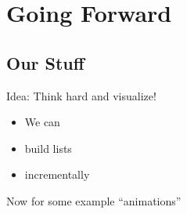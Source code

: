 \documentclass[aspectratio=169,hyperref={pdfusetitle,pdfencoding=auto}]{beamer}
\begin{document}
\section{Going Forward}

\subsection{Our Stuff}

\begin{frame}{Idea: Think hard and visualize!}
\begin{itemize}[<+->]
  \item We can
  \item build lists
  \item incrementally
\end{itemize}
\vfill
Now for some example \enquote{animations}
\end{frame}
\end{document}
